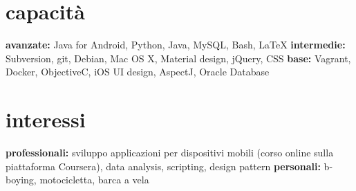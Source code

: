 \documentclass[print]{friggeri-custom} %
\begin{document}
\begin{entrylist}

\end{entrylist}


\section{capacità}

\textbf{avanzate:} Java for Android, Python, Java, MySQL, Bash, \LaTeX{} \textbf{intermedie:} Subversion, git, Debian, Mac OS X, Material design, jQuery, CSS \textbf{base:} Vagrant, Docker, ObjectiveC, iOS UI design, AspectJ, Oracle Database


\section{interessi}

\textbf{professionali:} sviluppo applicazioni per dispositivi mobili (corso online sulla piattaforma Coursera), data analysis, scripting, design pattern \textbf{personali:} b-boying, motocicletta, barca a vela
\end{document}
